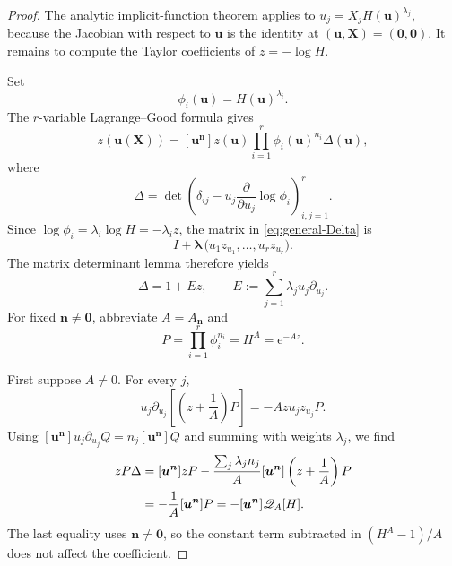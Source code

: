 \documentclass[11pt,oneside]{article}
\theoremstyle{plain}
\theoremstyle{definition}
\theoremstyle{remark}
\newcommand{\e}{\mathrm{e}}
\begin{document}
\begin{proof}
The analytic implicit-function theorem applies to
\(u_j=X_jH(\bm u)^{\lambda_j}\), because the Jacobian with respect to
\(\bm u\) is the identity at \((\bm u,\bm X)=(\bm0,\bm0)\).  It remains to
compute the Taylor coefficients of \(z=-\log H\).

Set
\begin{equation}
 \phi_i(\bm u)=H(\bm u)^{\lambda_i}.
 \label{eq:general-phi}
\end{equation}
The \(r\)-variable Lagrange--Good formula gives
\begin{equation}
 [\bm X^{\bm n}]z(\bm u(\bm X))
 =[\bm u^{\bm n}]z(\bm u)
 \prod_{i=1}^r\phi_i(\bm u)^{n_i}\Delta(\bm u),
 \label{eq:general-Good-coeff}
\end{equation}
where
\begin{equation}
 \Delta=\det\left(
 \delta_{ij}-u_j\frac{\partial}{\partial u_j}\log\phi_i
 \right)_{i,j=1}^r.
 \label{eq:general-Delta}
\end{equation}
Since \(\log\phi_i=\lambda_i\log H=-\lambda_i z\), the matrix in
\eqref{eq:general-Delta} is
\begin{equation}
 I+\bm\lambda\,\bigl(u_1z_{u_1},\ldots,u_rz_{u_r}\bigr).
 \label{eq:rank-one-matrix}
\end{equation}
The matrix determinant lemma therefore yields
\begin{equation}
 \Delta=1+Ez,
 \qquad
 E:=\sum_{j=1}^r\lambda_ju_j\partial_{u_j}.
 \label{eq:general-Delta-rank-one}
\end{equation}
For fixed \(\bm n\ne\bm0\), abbreviate
\(A=A_{\bm n}\) and
\begin{equation}
 P=\prod_{i=1}^r\phi_i^{n_i}=H^A=\e^{-Az}.
 \label{eq:general-P}
\end{equation}

First suppose \(A\ne0\).  For every \(j\),
\begin{equation}
 u_j\partial_{u_j}\left[\left(z+\frac1A\right)P\right]
 =-Azu_jz_{u_j}P.
 \label{eq:general-derivative-cancellation}
\end{equation}
Using
\([\bm u^{\bm n}]u_j\partial_{u_j}Q=n_j[\bm u^{\bm n}]Q\)
and summing with weights \(\lambda_j\), we find
\begin{align}
 [\bm u^{\bm n}]zP\Delta
 &=[\bm u^{\bm n}]zP
 -\frac{\sum_j\lambda_jn_j}{A}
 [\bm u^{\bm n}]\left(z+\frac1A\right)P \notag\\
 &=-\frac1A[\bm u^{\bm n}]P
 =-[\bm u^{\bm n}]\mathscr Q_A[H].
 \label{eq:general-cancellation-result}
\end{align}
The last equality uses \(\bm n\ne\bm0\), so the constant term subtracted in
\((H^A-1)/A\) does not affect the coefficient.


\end{proof}
\end{document}
